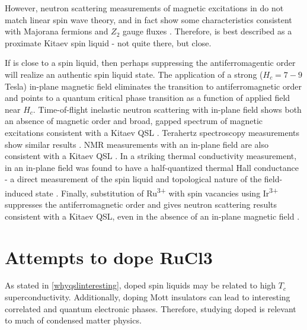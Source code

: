 However, neutron scattering measurements of magnetic excitations in \rucl do not match linear spin wave theory, and in fact show some characteristics consistent with Majorana fermions and $Z_{2}$ gauge fluxes \cite{Banerjee2017}. Therefore, \rucl is best described as a proximate Kitaev spin liquid - not quite there, but close.

If \rucl is close to a spin liquid, then perhaps suppressing the antiferromagentic order will realize an authentic spin liquid state. 	The application of a strong ($H_{c} = 7-9$ Tesla) in-plane magnetic field eliminates the transition to antiferromagnetic order and points to a quantum critical phase transition as a function of applied field near $H_{c}$. Time-of-flight inelastic neutron scattering with in-plane field shows both an absence of magnetic order and broad, gapped spectrum of magnetic excitations consistent with a Kitaev QSL \cite{Banerjee2017}. Terahertz spectroscopy measurements show similar results \cite{Wang2017}. NMR measurements with an in-plane field are also consistent with a Kitaev QSL \cite{Baek2017}. In a striking thermal conductivity measurement, \rucl in an in-plane field was found to have a half-quantized thermal Hall conductance - a direct measurement of the spin liquid and topological nature of the field-induced state \cite{Kasahara2018}. Finally, substitution of Ru\textsuperscript{3+} with spin vacancies using Ir\textsuperscript{3+} suppresses the antiferromagnetic order and gives neutron scattering results consistent with a Kitaev QSL, even in the absence of an in-plane magnetic field \cite{Lampen-Kelley2017}.

\section{Attempts to dope RuCl3}
As stated in \ref{whyqslinteresting}, doped spin liquids may be related to high $T_{c}$ superconductivity. Additionally, doping Mott insulators can lead to interesting correlated and quantum electronic phases. Therefore, studying doped \rucl is relevant to much of condensed matter physics.

